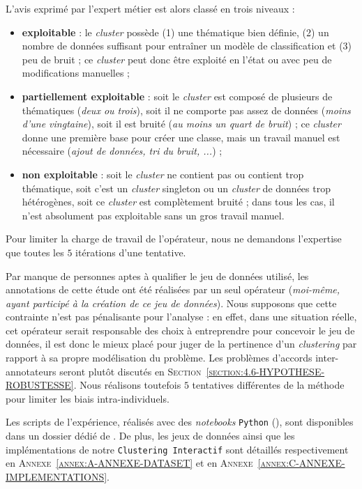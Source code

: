 			L'avis exprimé par l'expert métier est alors classé en trois niveaux :
			\begin{itemize}
				\item \textbf{exploitable} : le \textit{cluster} possède (1) une thématique bien définie, (2) un nombre de données suffisant pour entraîner un modèle de classification et (3) peu de bruit ; ce \textit{cluster} peut donc être exploité en l'état ou avec peu de modifications manuelles ;
				\item \textbf{partiellement exploitable} : soit le \textit{cluster} est composé de plusieurs de thématiques (\textit{deux ou trois}), soit il ne comporte pas assez de données (\textit{moins d'une vingtaine}), soit il est bruité (\textit{au moins un quart de bruit}) ; ce \textit{cluster} donne une première base pour créer une classe, mais un travail manuel est nécessaire (\textit{ajout de données, tri du bruit, ...}) ;
				\item \textbf{non exploitable} : soit le \textit{cluster} ne contient pas ou contient trop thématique, soit c'est un \textit{cluster} singleton ou un \textit{cluster} de données trop hétérogènes, soit ce \textit{cluster} est complètement bruité ; dans tous les cas, il n'est absolument pas exploitable sans un gros travail manuel.
			\end{itemize}
			
			Pour limiter la charge de travail de l'opérateur, nous ne demandons l'expertise que toutes les $5$ itérations d'une tentative.
			
			\begin{leftBarWarning}
				Par manque de personnes aptes à qualifier le jeu de données utilisé, les annotations de cette étude ont été réalisées par un seul opérateur (\textit{moi-même, ayant participé à la création de ce jeu de données}).
				Nous supposons que cette contrainte n'est pas pénalisante pour l'analyse : en effet, dans une situation réelle, cet opérateur serait responsable des choix à entreprendre pour concevoir le jeu de données, il est donc le mieux placé pour juger de la pertinence d'un \textit{clustering} par rapport à sa propre modélisation du problème.
				Les problèmes d'accords inter-annotateurs seront plutôt discutés en \textsc{Section~\ref{section:4.6-HYPOTHESE-ROBUSTESSE}}.
				Nous réalisons toutefois $5$ tentatives différentes de la méthode pour limiter les biais intra-individuels.
			\end{leftBarWarning}
			
			\begin{leftBarInformation}
				Les scripts de l'expérience, réalisés avec des \textit{notebooks} \texttt{Python} (\cite{van-rossum-drake:2009:python-reference-manual}), sont disponibles dans un dossier dédié de \cite{schild:2021:cognitivefactory-interactiveclusteringcomparativestudy}.
				De plus, les jeux de données ainsi que les implémentations de notre \texttt{Clustering Interactif} sont détaillés respectivement en \textsc{Annexe~\ref{annex:A-ANNEXE-DATASET}} et en \textsc{Annexe~\ref{annex:C-ANNEXE-IMPLEMENTATIONS}}.
			\end{leftBarInformation}
			

